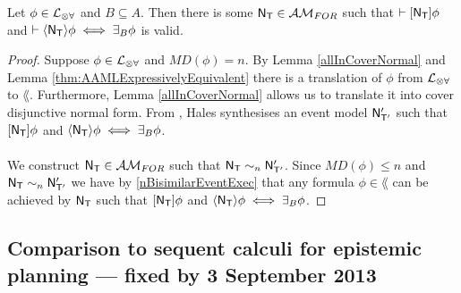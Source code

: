 \begin{corr} \label{approximatingBRestricted}
Let $\phi \in \langArbAct$ and $B \subseteq A$.
Then there is some $\evM_\evT \in \forestClass$ such that $\vdash \sqex{\evM_\evT} \phi$ and
$\vdash \anex{\evM_\evT} \phi \iff \exists_B \phi$ is valid.
\end{corr}

\begin{proof}
Suppose $\phi \in \langArbAct$ and $MD(\phi) = n$.
By Lemma \ref{allInCoverNormal} and Lemma \ref{thm:AAMLExpressivelyEquivalent} there is a translation of $\phi$ from $\langArbAct$ to $\lang$.
Furthermore, Lemma \ref{allInCoverNormal} allows us to translate it into cover disjunctive normal form.
From \cite{hales13synthesis}, Hales synthesises an event model $\evM'_{\evT'}$ such that $\sqex{\evM_\evT} \phi$ and $\anex{\evM_\evT}
\phi \iff \exists_B \phi$.\\
\\
We construct $\evM_\evT \in \forestClass$ such that $\evM_\evT \sim_n \evM'_{\evT'}$.
Since $MD(\phi) \leq n$ and $\evM_\evT \sim_n \evM'_{\evT'}$ we have by \ref{nBisimilarEventExec} that any
formula $\phi \in \lang$ can be achieved by $\evM_\evT$ such that $\sqex{\evM_\evT} \phi$ and $\anex{\evM_\evT} \phi
\iff \exists_B \phi$.
\end{proof}

\subsection{Comparison to sequent calculi for epistemic planning --- fixed by 3 September 2013}

